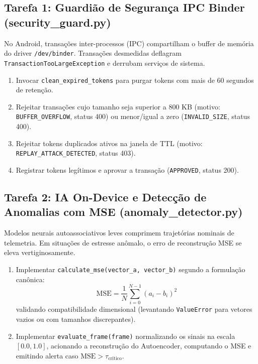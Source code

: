 \subsection{Tarefa 1: Guardião de Segurança IPC Binder (security\_guard.py)}
No Android, transações inter-processos (IPC) compartilham o buffer de memória do driver \texttt{/dev/binder}. Transações desmedidas deflagram \texttt{TransactionTooLargeException} e derrubam serviços de sistema.
\begin{enumerate}
    \item Invocar \texttt{clean\_expired\_tokens} para purgar tokens com mais de 60 segundos de retenção.
    \item Rejeitar transações cujo tamanho seja superior a 800 KB (motivo: \texttt{BUFFER\_OVERFLOW}, status 400) ou menor/igual a zero (\texttt{INVALID\_SIZE}, status 400).
    \item Rejeitar tokens duplicados ativos na janela de TTL (motivo: \texttt{REPLAY\_ATTACK\_DETECTED}, status 403).
    \item Registrar tokens legítimos e aprovar a transação (\texttt{APPROVED}, status 200).
\end{enumerate}

\subsection{Tarefa 2: IA On-Device e Detecção de Anomalias com MSE (anomaly\_detector.py)}
Modelos neurais autoassociativos leves comprimem trajetórias nominais de telemetria. Em situações de estresse anômalo, o erro de reconstrução MSE se eleva vertiginosamente.
\begin{enumerate}
    \item Implementar \texttt{calculate\_mse(vector\_a, vector\_b)} segundo a formulação canônica:
    \begin{equation}
        \text{MSE} = \frac{1}{N} \sum_{i=0}^{N-1} (a_i - b_i)^2
    \end{equation}
    validando compatibilidade dimensional (levantando \texttt{ValueError} para vetores vazios ou com tamanhos discrepantes).
    \item Implementar \texttt{evaluate\_frame(frame)} normalizando os sinais na escala $[0.0, 1.0]$, acionando a reconstrução do Autoencoder, computando o MSE e emitindo alerta caso $\text{MSE} > \tau_{\text{critico}}$.
\end{enumerate}

